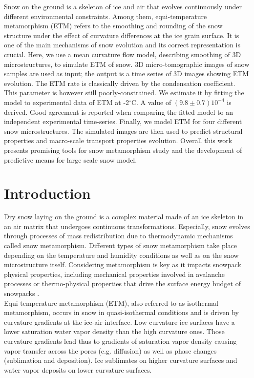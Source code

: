 \documentclass[draft,ms]{agujournal2019}
\begin{document}
Snow on the ground is a skeleton of ice and air that evolves continuously under different environmental constraints. Among them, equi-temperature metamorphism (ETM) refers to the smoothing and rounding of the snow structure under the effect of curvature differences at the ice grain surface. It is one of the main mechanisms of snow evolution and its correct representation is crucial. Here, we use a mean curvature flow model, describing smoothing of 3D microstructures, to simulate ETM of snow. 3D micro-tomographic images of snow samples are used as input; the output is a time series of 3D images showing ETM evolution. The ETM rate is classically driven by the condensation coefficient. This parameter is however still poorly-constrained. We estimate it by fitting the model to experimental data of ETM at -2$^\circ$C. A value of $(9.8\pm0.7)10^{-4}$ is derived. Good agreement is reported when comparing the fitted model to an independent experimental time-series. Finally, we model ETM for four different snow microstructures. The simulated images are then used to predict structural properties and macro-scale transport properties evolution.
Overall this work presents promising tools for snow metamorphism study and the development of predictive means for large scale snow model. 

\section{Introduction}
\label{sec:intro}
Dry snow laying on the ground is a complex material made of an ice skeleton in an air matrix that undergoes continuous transformations. Especially, snow evolves through processes of mass redistribution due to thermodynamic mechanisms called snow metamorphism. Different types of snow metamorphism take place depending on the temperature and humidity conditions as well as on the snow microstructure itself. Considering metamorphism is key as it impacts snowpack physical properties, including mechanical properties involved in avalanche processes or thermo-physical properties that drive the surface energy budget of snowpacks \cite{lehning_physical_2002, vionnet_detailed_2012}.\\

Equi-temperature metamorphism (ETM), also referred to as isothermal metamorphism, occurs in snow in quasi-isothermal conditions and is driven by curvature gradients at the ice-air interface. Low curvature ice surfaces have a lower saturation water vapor density than the high curvature ones. Those curvature gradients lead thus to gradients of saturation vapor density causing vapor transfer across the pores (e.g. diffusion) as well as phase changes (sublimation and deposition). Ice sublimates on higher curvature surfaces and  water vapor deposits on lower curvature surfaces. 
\end{document}
